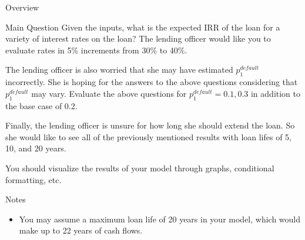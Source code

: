 \documentclass[]{article}
\begin{document}
\begin{section}{Overview}
\begin{subsection}{Main Question}
    Given the inputs, what is the expected IRR of the loan for a variety of interest rates on the loan? The lending
    officer would like you to evaluate rates in 5\% increments from 30\% to 40\%.
    
    The lending officer is also worried that she may have estimated $p_1^{default}$ incorrectly. 
    She is hoping for the answers to the above questions considering that $p_1^{default}$ may vary.
    Evaluate the above questions for $p_1^{default} = 0.1, 0.3$ in addition to the base case 
    of 0.2.

    Finally, the lending officer is unsure for how long she should extend the loan. So she would like to see all
    of the previously mentioned results with loan lifes of 5, 10, and 20 years.

    You should visualize the results of your model through graphs, conditional formatting, etc.
    
\end{subsection}
\begin{subsection}{Notes}
\begin{itemize}
\item 
    You may assume a maximum loan life of 20 years in your model, which would make up to 22 years of cash flows.
    

\end{itemize}
\end{subsection}
\end{section}
\end{document}
